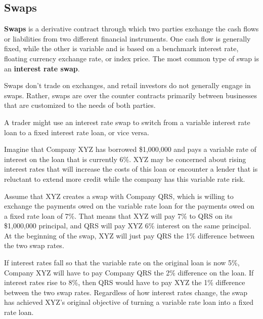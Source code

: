 \documentclass{article}
\begin{document}
  \subsection{Swaps}

    \begin{definition}
      \textbf{Swaps} is a derivative contract through which two parties exchange the cash flows or liabilities from two different financial instruments. One cash flow is generally fixed, while the other is variable and is based on a benchmark interest rate, floating currency exchange rate, or index price. The most common type of swap is an \textbf{interest rate swap}. 

      Swaps don't trade on exchanges, and retail investors do not generally engage in swaps. Rather, swaps are over the counter contracts primarily between businesses that are customized to the needs of both parties. 
    \end{definition}

    \begin{example}
      A trader might use an interest rate swap to switch from a variable interest rate loan to a fixed interest rate loan, or vice versa. 

      Imagine that Company XYZ has borrowed \$1,000,000 and pays a variable rate of interest on the loan that is currently 6\%. XYZ may be concerned about rising interest rates that will increase the costs of this loan or encounter a lender that is reluctant to extend more credit while the company has this variable rate risk. 

      Assume that XYZ creates a swap with Company QRS, which is willing to exchange the payments owed on the variable rate loan for the payments owed on a fixed rate loan of 7\%. That means that XYZ will pay 7\% to QRS on its \$1,000,000 principal, and QRS will pay XYZ 6\% interest on the same principal. At the beginning of the swap, XYZ will just pay QRS the 1\% difference between the two swap rates.

      If interest rates fall so that the variable rate on the original loan is now 5\%, Company XYZ will have to pay Company QRS the 2\% difference on the loan. If interest rates rise to 8\%, then QRS would have to pay XYZ the 1\% difference between the two swap rates. Regardless of how interest rates change, the swap has achieved XYZ's original objective of turning a variable rate loan into a fixed rate loan.
    \end{example}
\end{document}
